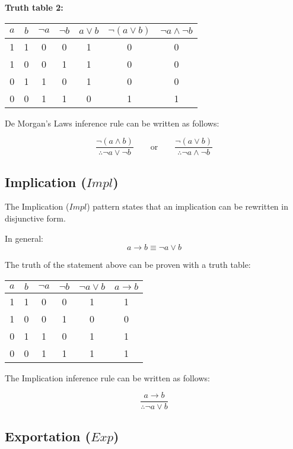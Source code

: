 \documentclass[12pt,a4paper,openany]{article}
\begin{document}
\textbf{Truth table 2:}

\begin{center}
\begin{tabular}{|c|c|c|c|c|c|c|}
\hline
\(a\) & \(b\) & \(\neg a\) & \(\neg b\) & \(a \lor b\) & \(\neg (a \lor b)\) & \(\neg a \land \neg b\) \\
\hline
1 & 1 & 0 & 0 & 1 & 0 & 0 \\
1 & 0 & 0 & 1 & 1 & 0 & 0 \\
0 & 1 & 1 & 0 & 1 & 0 & 0 \\
0 & 0 & 1 & 1 & 0 & 1 & 1 \\
\hline
\end{tabular}
\end{center}

De Morgan's Laws inference rule can be written as follows:

\[
\frac{\lnot (a \land b)}{\therefore \lnot a \lor \lnot b}
\qquad \text{or} \qquad
\frac{\lnot (a \lor b)}{\therefore \lnot a \land \lnot b}
\]

\subsection{Implication (\(Impl\))}\label{implication-impl}

The Implication (\(Impl\)) pattern states that an implication can be rewritten in disjunctive form.

In general:
\[a \to b \equiv \lnot a \lor b\]

The truth of the statement above can be proven with a truth table:

\begin{center}
\begin{tabular}{|c|c|c|c|c|c|}
\hline
\(a\) & \(b\) & \(\neg a\) & \(\neg b\) & \(\neg a \lor b\) & \(a \to b\) \\
\hline
1 & 1 & 0 & 0 & 1 & 1 \\
1 & 0 & 0 & 1 & 0 & 0 \\
0 & 1 & 1 & 0 & 1 & 1 \\
0 & 0 & 1 & 1 & 1 & 1 \\
\hline
\end{tabular}
\end{center}

The Implication inference rule can be written as follows:

\[
\frac{a \to b}{\therefore \lnot a \lor b}
\]

\subsection{Exportation (\(Exp\))}\label{exportation-exp}
\end{document}
